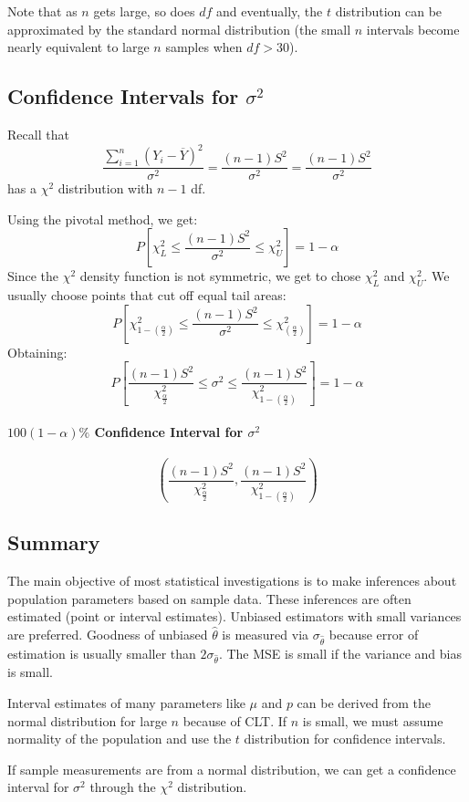 \documentclass[12 pt]{article}
\theoremstyle{definition}
\begin{document}
Note that as $n$ gets large, so does $df$ and eventually, the $t$
distribution can be approximated by the standard normal distribution
(the small $n$ intervals become nearly equivalent to large $n$ samples
when $df > 30$).
\subsection{Confidence Intervals for $\sigma^2$}
Recall that $$\frac{\sum_{i=1}^n (Y_i -
  \overline{Y})^2}{\sigma^2}=\frac{(n-1)S^2}{\sigma^2} =
\frac{(n-1)S^2}{\sigma^2}$$ has a $\chi^2$ distribution with $n-1$
df.

Using the pivotal method, we get:
$$P \left[\chi_L^2 \leq \frac{(n-1)S^2}{\sigma^2} \leq \chi_U^2\right]
= 1 - \alpha $$
Since the $\chi^2$ density function is not symmetric, we get to chose
$\chi_L^2$ and $\chi_U^2$. We usually choose points that cut off equal
tail areas:
$$P \left[\chi_{1-(\frac{\alpha}{2})}^2 \leq \frac{(n-1)S^2}{\sigma^2} \leq \chi_{\left(\frac{\alpha}{2}\right)}^2\right]
= 1 - \alpha $$
Obtaining:
$$P \left[\frac{(n-1)S^2}{\chi^2_{\frac{\alpha}{2}}} \leq \sigma^2
  \leq
  \frac{(n-1)S^2}{\chi^2_{1-\left(\frac{\alpha}{2}\right)}}\right] = 1- \alpha$$
\paragraph{$100(1-\alpha)\%$ Confidence Interval for $\sigma^2$}
$$
\left(
  \frac{(n-1)S^2}{\chi^2_{\frac{\alpha}{2}}}, \frac{(n-1)S^2}{\chi^2_{1-
      \left(
        \frac{\alpha}{2}
      \right)}}
\right)$$
\subsection{Summary}
The main objective of most statistical investigations is to make
inferences about population parameters based on sample data. These
inferences are often estimated (point or interval estimates). Unbiased
estimators with small variances are preferred. Goodness of unbiased
$\hat{\theta}$ is measured via $\sigma_{\hat{\theta}}$ because error
of estimation is usually smaller than $2\sigma_{\hat{\theta}}$. The
MSE is small if the variance and bias is small.

Interval estimates of many parameters like $\mu$ and $p$ can be
derived from the normal distribution for large $n$ because of CLT. If
$n$ is small, we must assume normality of the population and use the
$t$ distribution for confidence intervals.

If sample measurements are from a normal distribution, we can get a
confidence interval for $\sigma^2$ through the $\chi^2$ distribution. 
\end{document}
